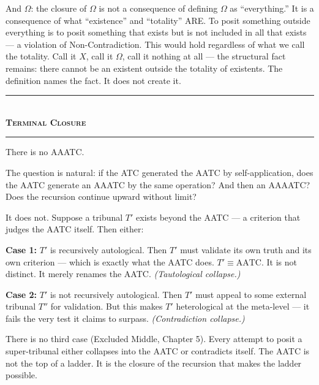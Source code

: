 \documentclass[10pt, openany, oneside]{book}
\renewcommand{\normalsize}{\fontsize{10}{13}\selectfont}
\begin{document}
And $\Omega$: the closure of $\Omega$ is not a consequence of defining $\Omega$ as ``everything.'' It is a consequence of what ``existence'' and ``totality'' ARE. To posit something outside everything is to posit something that exists but is not included in all that exists --- a violation of Non-Contradiction. This would hold regardless of what we call the totality. Call it $X$, call it $\Omega$, call it nothing at all --- the structural fact remains: there cannot be an existent outside the totality of existents. The definition names the fact. It does not create it.

\vspace{1.5em}


\begin{center}
    \rule{0.3\textwidth}{0.4pt}\\[0.5em]
    {\normalsize\bfseries\scshape Terminal Closure}\\[0.3em]
    \rule{0.3\textwidth}{0.4pt}
\end{center}

\vspace{1em}

\noindent There is no AAATC.

The question is natural: if the ATC generated the AATC by self-application, does the AATC generate an AAATC by the same operation? And then an AAAATC? Does the recursion continue upward without limit?

It does not. Suppose a tribunal $T'$ exists beyond the AATC --- a criterion that judges the AATC itself. Then either:

\textbf{Case 1:} $T'$ is recursively autological. Then $T'$ must validate its own truth and its own criterion --- which is exactly what the AATC does. $T' \equiv \text{AATC}$. It is not distinct. It merely renames the AATC. \textit{(Tautological collapse.)}

\textbf{Case 2:} $T'$ is not recursively autological. Then $T'$ must appeal to some external tribunal $T''$ for validation. But this makes $T'$ heterological at the meta-level --- it fails the very test it claims to surpass. \textit{(Contradiction collapse.)}

There is no third case (Excluded Middle, Chapter 5). Every attempt to posit a super-tribunal either collapses into the AATC or contradicts itself. The AATC is not the top of a ladder. It is the closure of the recursion that makes the ladder possible.
\end{document}
